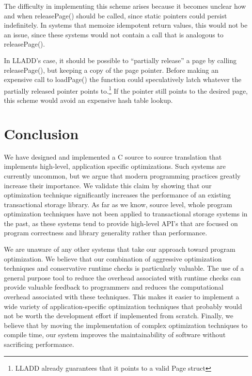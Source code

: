 \documentclass[10pt,letterpaper,twocolumn,english]{article}
\newcommand{\yad}{LLADD\xspace}
\newcommand{\pin}{loadPage()\xspace}
\newcommand{\unpin}{releasePage()\xspace}
\begin{document}
The difficulty in implementing this scheme arises because it becomes
unclear how and when \unpin should be called, since static pointers
could persist indefinitely.  In systems that
memoize idempotent return values, this would not be an issue, since
these systems would not contain a call that is analogous to \unpin.

In \yad's case, it should be possible to ``partially release'' a page by
calling \unpin, but keeping a copy of the page pointer.  Before making
an expensive call to \pin the function could speculatively latch
whatever the partially released pointer points
to.\footnote{\yad already guarantees that it points to a valid Page
struct} If the pointer still points to the desired page, this
scheme would avoid an expensive hash table lookup.

\section{Conclusion}

We have designed and implemented a C source to source translation that
implements high-level, application specific optimizations.  Such
systems are currently uncommon, but we argue that modern programming
practices greatly increase their importance.  We validate this claim
by showing that our optimization technique significantly increases the
performance of an existing transactional storage library.  As far as
we know, source level, whole program optimization techniques have not
been applied to transactional storage systems in the past, as these
systems tend to provide high-level API's that are focused on program 
correctness and library generality rather than performance.
 
We are unaware of any other
systems that take our approach toward program optimization.  We
believe that our combination of aggressive optimization techniques
and conservative runtime checks is particularly valuable.  The use of
a general purpose tool to reduce the overhead associated with runtime
checks can provide valuable feedback to programmers and reduces the 
computational overhead associated with these techniques.  This
makes it easier to implement a wide variety of application-specific
optimization techniques that probably would not be worth the
development effort if implemented from scratch.  Finally, we believe
that by moving the implementation of complex optimization techniques
to compile time, our system improves the maintainability of software
without sacrificing performance.
\end{document}
